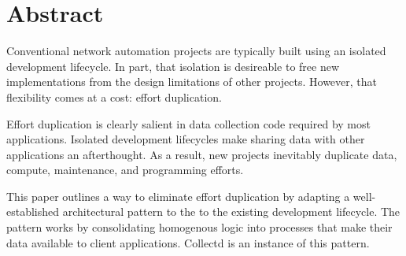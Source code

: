 %
\chapter*{Abstract}\label{sec:abstract}\vspace*{-10mm}
Conventional network automation projects are typically built using an isolated
development lifecycle. In part, that isolation is desireable to free new 
implementations from the design limitations of other projects. However, that 
flexibility comes at a cost: effort duplication.

Effort duplication is clearly salient in data collection code required by most 
applications. Isolated development lifecycles make sharing data with other
applications an afterthought. As a result, new projects inevitably duplicate 
data, compute, maintenance, and programming efforts. 

This paper outlines a way to eliminate effort duplication by adapting a 
well-established architectural pattern to the to the existing development 
lifecycle. The pattern works by consolidating homogenous logic into processes 
that make their data available to client applications. Collectd is an instance 
of this pattern. 
